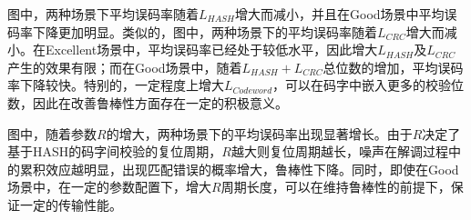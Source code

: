 图中，两种场景下平均误码率随着$L_{HASH}$增大而减小，并且在Good场景中平均误码率下降更加明显。类似的，图中，两种场景下的平均误码率随着$L_{CRC}$增大而减小。在Excellent场景中，平均误码率已经处于较低水平，因此增大$L_{HASH}$及$L_{CRC}$产生的效果有限；而在Good场景中，随着$L_{HASH}+L_{CRC}$总位数的增加，平均误码率下降较快。特别的，一定程度上增大$L_{Codeword}$，可以在码字中嵌入更多的校验位数，因此在改善鲁棒性方面存在一定的积极意义。

图中，随着参数$R$的增大，两种场景下的平均误码率出现显著增长。由于$R$决定了基于HASH的码字间校验的复位周期，$R$越大则复位周期越长，噪声在解调过程中的累积效应越明显，出现匹配错误的概率增大，鲁棒性下降。同时，即使在Good场景中，在一定的参数配置下，增大$R$周期长度，可以在维持鲁棒性的前提下，保证一定的传输性能。

